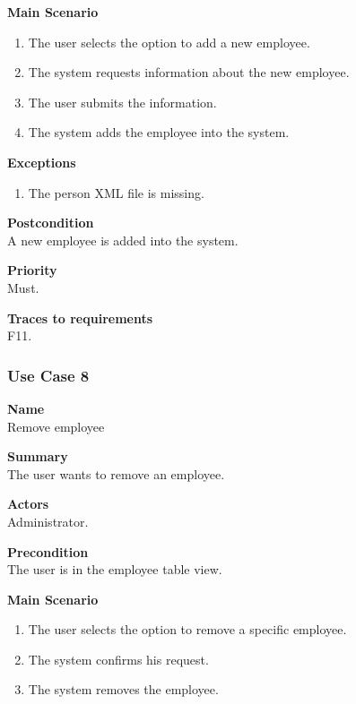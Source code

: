 \documentclass[12pt]{article}
\begin{document}
\noindent
{\bf Main Scenario}\\
\vspace*{-0.35in}
\begin{enumerate}
\item The user selects the option to add a new employee.
\vspace*{-0.1in}
\item The system requests information about the new employee.
\vspace*{-0.1in}
\item The user submits the information.
\vspace*{-0.1in}
\item The system adds the employee into the system.
\end{enumerate}
\vspace*{-0.1in}

\noindent
{\bf Exceptions}\\
\vspace*{-0.35in}
\begin{enumerate}
\item The person XML file is missing.
\end{enumerate}
\vspace*{-0.1in}

\noindent
{\bf Postcondition}\\
A new employee is added into the system.

\noindent
{\bf Priority}\\
Must.

\noindent
{\bf Traces to requirements}\\
F11.

\subsubsection{Use Case 8} \label{uc:8}

\noindent
{\bf Name}\\
Remove employee

\noindent
{\bf Summary}\\
The user wants to remove an employee.

\noindent
{\bf Actors}\\
Administrator.

\noindent
{\bf Precondition}\\
The user is in the employee table view.

\noindent
{\bf Main Scenario}\\
\vspace*{-0.35in}
\begin{enumerate}
\item The user selects the option to remove a specific employee.
\vspace*{-0.1in}
\item The system confirms his request.
\vspace*{-0.1in}
\item The system removes the employee.
\end{enumerate}
\vspace*{-0.1in}
\end{document}
